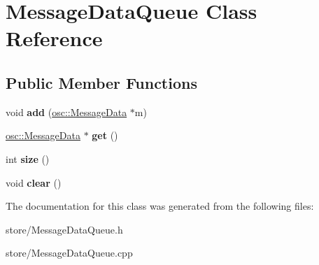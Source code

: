 \hypertarget{classMessageDataQueue}{}\section{Message\+Data\+Queue Class Reference}
\label{classMessageDataQueue}
\subsection*{Public Member Functions}
\begin{DoxyCompactItemize}
\item 
void {\bfseries add} (\hyperlink{classosc_1_1MessageData}{osc\+::\+Message\+Data} $\ast$m)\hypertarget{classMessageDataQueue_a8d2d0c5e6b879c240a5845b2c789c130}{}\label{classMessageDataQueue_a8d2d0c5e6b879c240a5845b2c789c130}

\item 
\hyperlink{classosc_1_1MessageData}{osc\+::\+Message\+Data} $\ast$ {\bfseries get} ()\hypertarget{classMessageDataQueue_ae1829552864a18207ca556edcb82a76d}{}\label{classMessageDataQueue_ae1829552864a18207ca556edcb82a76d}

\item 
int {\bfseries size} ()\hypertarget{classMessageDataQueue_a6f7619c03371e76b95a2c2d348da866d}{}\label{classMessageDataQueue_a6f7619c03371e76b95a2c2d348da866d}

\item 
void {\bfseries clear} ()\hypertarget{classMessageDataQueue_a565232895a0e0cc0416715aedf2e5e21}{}\label{classMessageDataQueue_a565232895a0e0cc0416715aedf2e5e21}

\end{DoxyCompactItemize}


The documentation for this class was generated from the following files\+:\begin{DoxyCompactItemize}
\item 
store/Message\+Data\+Queue.\+h\item 
store/Message\+Data\+Queue.\+cpp\end{DoxyCompactItemize}
